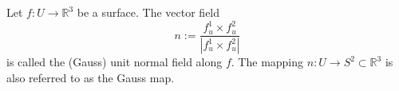 Let $f: U \to \mathbb{R}^3$ be a surface. The vector field
$$n := \frac{f_u^1 \times f_u^2}{|f_u^1 \times f_u^2|}$$
is called the (Gauss) unit normal field along $f$. The mapping $n: U \to S^2 \subset \mathbb{R}^3$ is also referred to as the Gauss map.
